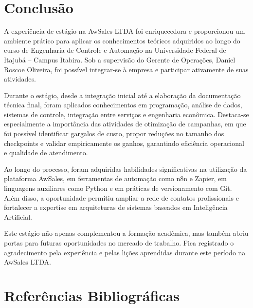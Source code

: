 \documentclass[12pt,a4paper,oneside]{article}
\begin{document}
\section{Conclusão}

A experiência de estágio na AwSales LTDA foi enriquecedora e proporcionou um ambiente prático para aplicar os conhecimentos teóricos adquiridos ao longo do curso de Engenharia de Controle e Automação na Universidade Federal de Itajubá -- Campus Itabira. Sob a supervisão do Gerente de Operações, Daniel Roscoe Oliveira, foi possível integrar-se à empresa e participar ativamente de suas atividades.

Durante o estágio, desde a integração inicial até a elaboração da documentação técnica final, foram aplicados conhecimentos em programação, análise de dados, sistemas de controle, integração entre serviços e engenharia econômica. Destaca-se especialmente a importância das atividades de otimização de campanhas, em que foi possível identificar gargalos de custo, propor reduções no tamanho dos checkpoints e validar empiricamente os ganhos, garantindo eficiência operacional e qualidade de atendimento.

Ao longo do processo, foram adquiridas habilidades significativas na utilização da plataforma AwSales, em ferramentas de automação como n8n e Zapier, em linguagens auxiliares como Python e em práticas de versionamento com Git. Além disso, a oportunidade permitiu ampliar a rede de contatos profissionais e fortalecer a expertise em arquiteturas de sistemas baseados em Inteligência Artificial.

Este estágio não apenas complementou a formação acadêmica, mas também abriu portas para futuras oportunidades no mercado de trabalho. Fica registrado o agradecimento pela experiência e pelas lições aprendidas durante este período na AwSales LTDA.

\section{Referências Bibliográficas}
\end{document}
